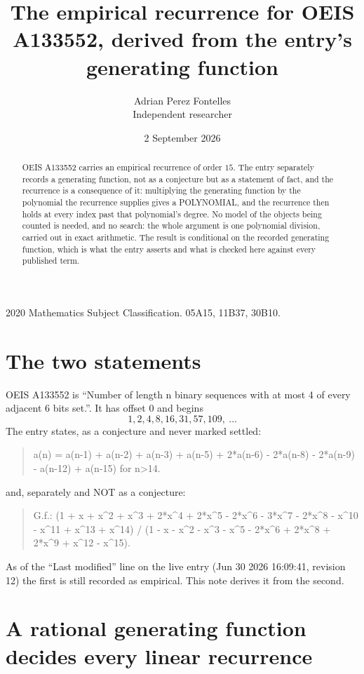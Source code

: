\documentclass[11pt,a4paper]{article}
\title{The empirical recurrence for OEIS A133552, derived from the entry's generating function}
\author{Adrian Perez Fontelles\\ \small Independent researcher}
\date{2 September 2026}
\theoremstyle{plain}
\theoremstyle{definition}
\begin{document}
\maketitle

\begin{abstract}
OEIS A133552 carries an empirical recurrence of order $15$. The entry separately records a
generating function, not as a conjecture but as a statement of fact, and the recurrence is a
consequence of it: multiplying the generating function by the polynomial the recurrence
supplies gives a POLYNOMIAL, and the recurrence then holds at every index past that
polynomial's degree. No model of the objects being counted is needed, and no search: the
whole argument is one polynomial division, carried out in exact arithmetic. The result is
conditional on the recorded generating function, which is what the entry asserts and what is
checked here against every published term.
\end{abstract}

\noindent\small 2020 Mathematics Subject Classification. 05A15, 11B37, 30B10.\normalsize

\section{The two statements}

OEIS A133552 is ``Number of length n binary sequences with at most 4 of every adjacent 6 bits set.''. It has offset $0$ and begins
\[
1, 2, 4, 8, 16, 31, 57, 109,\ \dots
\]
The entry states, as a conjecture and never marked settled:
\begin{quote}
a(n) = a(n-1) + a(n-2) + a(n-3) + a(n-5) + 2*a(n-6) - 2*a(n-8) - 2*a(n-9) - a(n-12) + a(n-15) for n>14.
\end{quote}
and, separately and NOT as a conjecture:
\begin{quote}
G.f.: (1 + x + x\^{}2 + x\^{}3 + 2*x\^{}4 + 2*x\^{}5 - 2*x\^{}6 - 3*x\^{}7 - 2*x\^{}8 - x\^{}10 - x\^{}11 + x\^{}13 + x\^{}14) / (1 - x - x\^{}2 - x\^{}3 - x\^{}5 - 2*x\^{}6 + 2*x\^{}8 + 2*x\^{}9 + x\^{}12 - x\^{}15).
\end{quote}
As of the ``Last modified'' line on the live entry (Jun 30 2026 16:09:41, revision 12) the first is still
recorded as empirical. This note derives it from the second.

\section{A rational generating function decides every linear recurrence}
\end{document}
